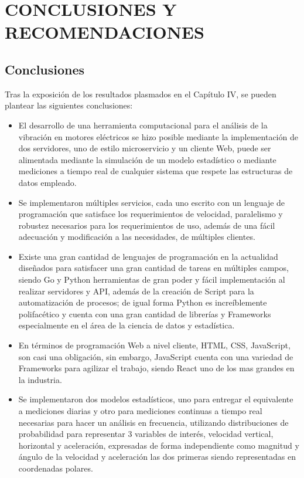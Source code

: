 \thispagestyle{empty}

\section*{CONCLUSIONES Y RECOMENDACIONES}
\subsection{Conclusiones}
Tras la exposición de los resultados plasmados en el Capítulo IV, se pueden
plantear las siguientes conclusiones:

\begin{itemize}
    \item El desarrollo  de una herramienta computacional para el análisis de
        la vibración en motores eléctricos se hizo posible mediante la
        implementación de dos servidores, uno de estilo
        microservicio y un cliente Web, puede ser alimentada mediante la
        simulación de un  modelo estadístico o
        mediante mediciones a tiempo real de cualquier sistema
        que respete las estructuras de datos empleado.
    \item Se implementaron múltiples servicios, cada uno escrito con un
        lenguaje de programación que satisface los requerimientos de velocidad,
        paralelismo y robustez necesarios para  los requerimientos de
        uso, además de una fácil adecuación y modificación a las necesidades,
        de múltiples clientes.
    \item Existe una gran cantidad de lenguajes de programación en la actualidad
        diseñados para satisfacer una gran cantidad de tareas en múltiples campos,
        siendo Go y Python herramientas de gran poder y fácil implementación
        al realizar servidores y API, además de la creación de Script
        para la automatización de procesos; de igual forma Python es increíblemente
        polifacético y cuenta con una gran cantidad de librerías y Frameworks
        especialmente en el área de la ciencia de datos y estadística.
    \item En términos de programación Web a nivel cliente,
        HTML, CSS, JavaScript, son casi una obligación, sin embargo,
        JavaScript cuenta con una  variedad de Frameworks para agilizar el
        trabajo, siendo React uno
        de los mas grandes en la industria.
    \item Se implementaron dos modelos estadísticos, uno para entregar el
        equivalente a mediciones diarias y otro para mediciones continuas a tiempo
        real necesarias para hacer un análisis en frecuencia,
        utilizando distribuciones de probabilidad para representar 3 variables de interés,
        velocidad vertical, horizontal y aceleración, expresadas de forma independiente
        como magnitud y ángulo de la velocidad y aceleración las dos primeras
        siendo representadas en coordenadas polares.


\end{itemize}
